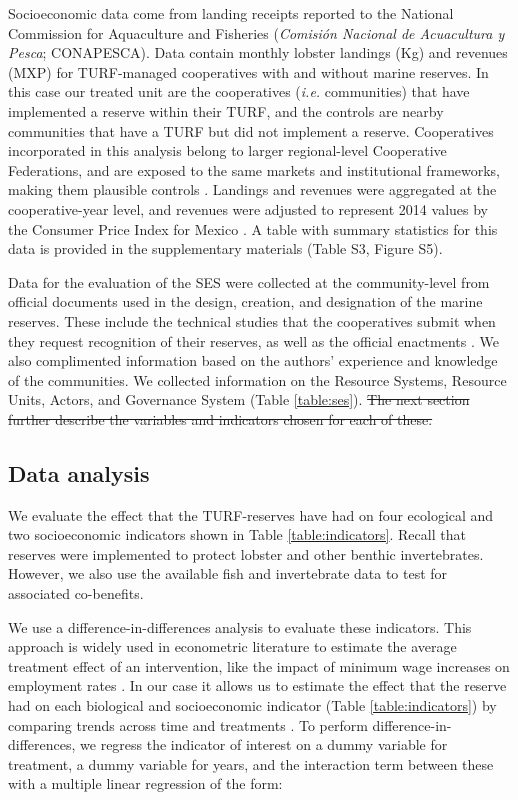 \documentclass{frontiersSCNS}
\providecommand{\DIFdeltex}[1]{{\protect\color{red}\sout{#1}}}                      %
\providecommand{\DIFdelbegin}{} %
\providecommand{\DIFdelend}{} %
\providecommand{\DIFdel}[1]{\texorpdfstring{\DIFdeltex{#1}}{}} %
\begin{document}
Socioeconomic data come from landing receipts reported to the National
Commission for Aquaculture and Fisheries (\emph{Comisión Nacional de
Acuacultura y Pesca}; CONAPESCA). Data contain monthly lobster landings
(Kg) and revenues (MXP) for TURF-managed cooperatives with and without
marine reserves. In this case our treated unit are the cooperatives
(\emph{i.e.} communities) that have implemented a reserve within their
TURF, and the controls are nearby communities that have a TURF but did
not implement a reserve. Cooperatives incorporated in this analysis
belong to larger regional-level Cooperative Federations, and are exposed
to the same markets and institutional frameworks, making them plausible
controls \citep{mccay_2017,ayer_2018}. Landings and revenues were
aggregated at the cooperative-year level, and revenues were adjusted to
represent 2014 values by the Consumer Price Index for Mexico
\citep{oecd_2017}. A table with summary statistics for this data is
provided in the supplementary materials (Table S3, Figure S5).

Data for the evaluation of the SES were collected at the community-level
from official documents used in the design, creation, and designation of
the marine reserves. These include the technical studies that the
cooperatives submit when they request recognition of their reserves, as
well as the official enactments
\citep{dof_website_2012,dof_website_2013,dof_website_2018}. We also
complimented information based on the authors' experience and knowledge
of the communities. We collected information on the Resource Systems,
Resource Units, Actors, and Governance System (Table \ref{table:ses}).
\DIFdelbegin \DIFdel{The next section further describe the variables and indicators chosen
for each of these.
}\DIFdelend 

\hypertarget{data-analysis}{%
\subsection{Data analysis}\label{data-analysis}}

We evaluate the effect that the TURF-reserves have had on four
ecological and two socioeconomic indicators shown in Table
\ref{table:indicators}. Recall that reserves were implemented to protect
lobster and other benthic invertebrates. However, we also use the
available fish and invertebrate data to test for associated co-benefits.

We use a difference-in-differences analysis to evaluate these
indicators. This approach is widely used in econometric literature to
estimate the average treatment effect of an intervention, like the
impact of minimum wage increases on employment rates \citep{card_1994}.
In our case it allows us to estimate the effect that the reserve had on
each biological and socioeconomic indicator (Table
\ref{table:indicators}) by comparing trends across time and treatments
\citep{moland_2013,Villasenor-Derbez_2018}. To perform
difference-in-differences, we regress the indicator of interest on a
dummy variable for treatment, a dummy variable for years, and the
interaction term between these with a multiple linear regression of the
form:
\end{document}
